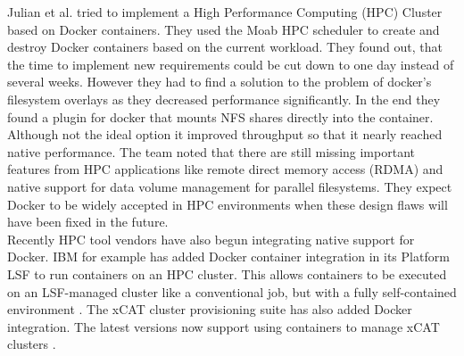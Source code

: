 \documentclass[conference]{IEEEtran}
\begin{document}
Julian et al. tried to implement a High Performance Computing (HPC) Cluster based on Docker containers. They used the Moab HPC scheduler to create and destroy Docker containers based on the current workload. They found out, that the time to implement new requirements could be cut down to one day instead of several weeks. However they had to find a solution to the problem of docker's filesystem overlays as they decreased performance significantly. In the end they found a plugin for docker that mounts NFS shares directly into the container. Although not the ideal option it improved throughput so that it nearly reached native performance. The team noted that there are still missing important features from HPC applications like remote direct memory access (RDMA) and native support for data volume management for parallel filesystems. They expect Docker to be widely accepted in HPC environments when these design flaws will have been fixed in the future.\\

Recently HPC tool vendors have also begun integrating native support for Docker. IBM for example has added Docker container integration in its Platform LSF to run containers on an HPC cluster. This allows containers to be executed on an LSF-managed cluster like a conventional job, but with a fully self-contained environment \cite{HPCDocking}. The xCAT cluster provisioning suite has also added Docker integration. The latest versions now support using containers to manage xCAT clusters \cite{xCAT}.
\end{document}
